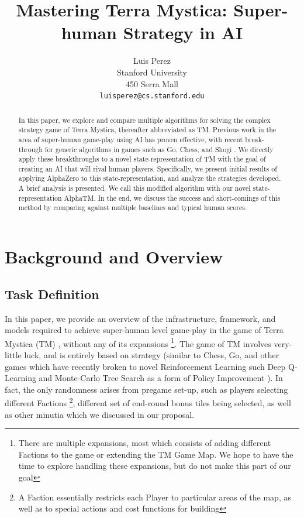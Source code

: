 \documentclass[10pt,twocolumn,letterpaper]{article}
\begin{document}
\title{Mastering Terra Mystica: Super-human Strategy in AI}

\author{
Luis Perez\\
Stanford University\\
450 Serra Mall\\
{\tt\small luisperez@cs.stanford.edu}
}

\maketitle
\thispagestyle{empty}

\begin{abstract}
In this paper, we explore and compare multiple algorithms for solving the complex strategy game of Terra Mystica, thereafter abbreviated as TM. Previous work in the area of super-human game-play using AI has proven effective, with recent break-through for generic algorithms in games such as Go, Chess, and Shogi \cite{AlphaZero}. We directly apply these breakthroughs to a novel state-representation of TM with the goal of creating an AI that will rival human players. Specifically, we present initial results of applying AlphaZero to this state-representation, and analyze the strategies developed. A brief analysis is presented. We call this modified algorithm with our novel state-representation AlphaTM. In the end, we discuss the success and short-comings of this method by comparing against multiple baselines and typical human scores.

\end{abstract}

\section{Background and Overview}
\label{section:background_and_overview}
\subsection{Task Definition}
\label{section:task_definition}
In this paper, we provide an overview of the infrastructure, framework, and models required to achieve super-human level game-play in the game of Terra Mystica (TM) \cite{TMBoardGeek}, without any of its expansions \footnote{There are multiple expansions, most which consists of adding different Factions to the game or extending the TM Game Map. We hope to have the time to explore handling these expansions, but do not make this part of our goal}. The game of TM involves very-little luck, and is entirely based on strategy (similar to Chess, Go, and other games which have recently broken to novel Reinforcement Learning such Deep Q-Learning and Monte-Carlo Tree Search as a form of Policy Improvement \cite{AlphaGo} \cite{AlphaGoZero}). In fact, the only randomness arises from pregame set-up, such as players selecting different Factions \footnote{A Faction essentially restricts each Player to particular areas of the map, as well as to special actions and cost functions for building}, different set of end-round bonus tiles being selected, as well as other minutia which we discussed in our proposal.
\end{document}

